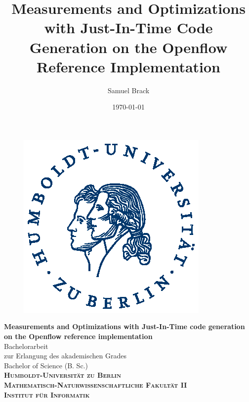 \documentclass[a4paper,
		12pt,
		parskip=full,
		titlepage
		]{scrartcl}
\title{Measurements and Optimizations with Just-In-Time Code Generation on the Openflow Reference Implementation}
\author{Samuel Brack}
\date{\today}
\begin{document}
\thispagestyle{empty}

\hspace{20cm}
\vspace{-3cm}

\begin{figure}[H] \hspace{11cm}
\includegraphics[width=3.2 cm]{HU_Logo}
\end{figure}
\begin{center}
  \huge{\bf Measurements and Optimizations with Just-In-Time code generation on the Openflow reference implementation} \\ %
  \vspace{1cm}
  \LARGE  Bachelorarbeit \\ %
  \vspace{1cm}
  \Large zur Erlangung des akademischen Grades \\
  Bachelor of Science (B. Sc.)\\ %
  \vspace{1.5cm}
  {\large
    \bf{
      \scshape
      Humboldt-Universit\"at zu Berlin \\
      Mathematisch-Naturwissenschaftliche Fakult\"at II \\
      Institut f\"ur Informatik\\
    }
  } 
\enlargethispage{10\baselineskip}
\end{center}
\vspace {1 cm}%
\end{document}
